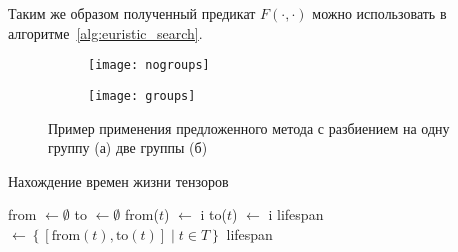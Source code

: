 Таким же образом полученный предикат $F(\cdot, \cdot)$ можно использовать в
алгоритме~\ref{alg:euristic_search}.

\begin{figure}
    \centering
    \begin{subfigure}[t]{\textwidth}\centering
    \texttt{[image: nogroups]}
    \caption{}
    \end{subfigure}
    \begin{subfigure}[t]{\textwidth}\centering
    \texttt{[image: groups]}    
    \caption{}
    \end{subfigure}
    \caption{Пример применения предложенного метода с разбиением на одну группу (а) две группы (б)}
\end{figure}

\begin{algorithm}
    \caption{Нахождение времен жизни тензоров}
    \label{alg:lifespans}
    \begin{algorithmic}[1] %
            \State from $\gets\emptyset$ 
            \State to $\gets\emptyset$ 
                        \State from($t$) $\gets$ i
                    \EndIf
                    \State to($t$) $\gets$ i
                \EndFor
            \EndFor
            \State lifespan $\gets \left\{[\text{from}(t), \text{to}(t)] \mid t \in T\right\}$
            \State \Return lifespan
        \EndFunction
    \end{algorithmic}
\end{algorithm}

